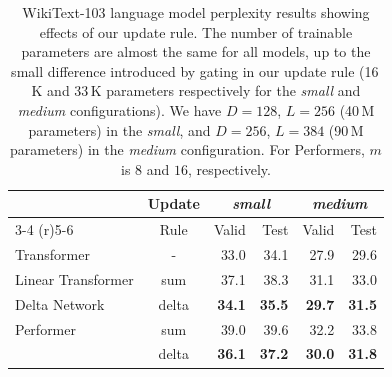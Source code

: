 \documentclass{article}
\theoremstyle{definition}
\begin{document}
\begin{table}[t]
\caption{WikiText-103 language model perplexity results
showing effects of our update rule.
The number of trainable parameters are almost the same for all models,
up to the small difference introduced by gating in our update rule (16\,K and 33\,K parameters
respectively for the \textit{small} and \textit{medium} configurations).
We have $D=128$, $L=256$ (40\,M parameters) in the \textit{small},
and $D=256$, $L=384$ (90\,M parameters) in the \textit{medium} configuration.
For Performers, $m$ is $8$ and $16$, respectively.
}
\label{tab:lm}
\vskip 0.15in
\begin{center}
\begin{small}
\begin{tabular}{lcrrrr}
\toprule
     &  Update  & \multicolumn{2}{c}{\textit{small}}  & \multicolumn{2}{c}{\textit{medium}} \\  \cmidrule(r){3-4}  \cmidrule(r){5-6}
          &  Rule  & \multicolumn{1}{r}{Valid} & \multicolumn{1}{r}{Test} & \multicolumn{1}{r}{Valid} & \multicolumn{1}{r}{Test}  \\ \midrule
Transformer   &   -      &  33.0  & 34.1  &  27.9   & 29.6 \\ \midrule
Linear Transformer   &   sum    &  37.1  & 38.3     &  31.1   & 33.0 \\
Delta Network          &  delta    &  \textbf{34.1}  & \textbf{35.5}  & \textbf{29.7} & \textbf{31.5} \\ \midrule
Performer &   sum    &  39.0  & 39.6  & 32.2 & 33.8 \\
          &  delta    &  \textbf{36.1}  & \textbf{37.2}  & \textbf{30.0} & \textbf{31.8} \\
\bottomrule
\end{tabular}
\end{small}
\end{center}
\vskip -0.1in


\end{table}
\end{document}
